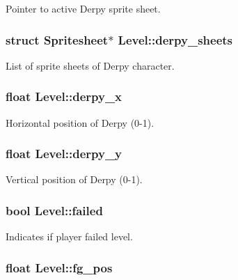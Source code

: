 \-Pointer to active \-Derpy sprite sheet. \hypertarget{structLevel_aad19c0af5ac43ceb72df311d89bd4297}{
\subsubsection[{derpy\-\_\-sheets}]{\setlength{\rightskip}{0pt plus 5cm}struct {\bf \-Spritesheet}$\ast$ {\bf \-Level\-::derpy\-\_\-sheets}}}\label{structLevel_aad19c0af5ac43ceb72df311d89bd4297}
\-List of sprite sheets of \-Derpy character. \hypertarget{structLevel_ae5a97d5b61c70c63e93992a9ff3935f9}{
\subsubsection[{derpy\-\_\-x}]{\setlength{\rightskip}{0pt plus 5cm}float {\bf \-Level\-::derpy\-\_\-x}}}\label{structLevel_ae5a97d5b61c70c63e93992a9ff3935f9}
\-Horizontal position of \-Derpy (0-\/1). \hypertarget{structLevel_a7b3c0f5af134797a1ed21ef48da3ab00}{
\subsubsection[{derpy\-\_\-y}]{\setlength{\rightskip}{0pt plus 5cm}float {\bf \-Level\-::derpy\-\_\-y}}}\label{structLevel_a7b3c0f5af134797a1ed21ef48da3ab00}
\-Vertical position of \-Derpy (0-\/1). \hypertarget{structLevel_a5bea34b31777260f1b23a1d64e6cd865}{
\subsubsection[{failed}]{\setlength{\rightskip}{0pt plus 5cm}bool {\bf \-Level\-::failed}}}\label{structLevel_a5bea34b31777260f1b23a1d64e6cd865}
\-Indicates if player failed level. \hypertarget{structLevel_a665bb93951ab6b7a91543712152a3acf}{
\subsubsection[{fg\-\_\-pos}]{\setlength{\rightskip}{0pt plus 5cm}float {\bf \-Level\-::fg\-\_\-pos}}}\label{structLevel_a665bb93951ab6b7a91543712152a3acf}
